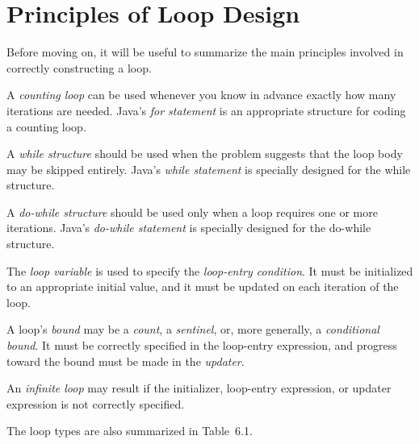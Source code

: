 \section{Principles of Loop Design}
\label{principlesof-loop-design}
\noindent Before moving on, it will be useful to summarize the main
principles involved in correctly
constructing a loop.

\begin{BL}
\item  A {\it counting loop} can
be used whenever you know in advance exactly how many iterations are
needed.  Java's {\it for statement} is an appropriate structure for
coding a counting loop.

\item  A {\it while structure} should
be used when the problem suggests that the loop body may be skipped
entirely. Java's {\it while statement} is specially designed for the
while structure.

\item  A {\it do-while structure} should
be used only when a loop requires one or more iterations. Java's
{\it do-while statement} is specially designed for the do-while structure.

\item  The {\it loop variable} is used to specify the
{\it loop-entry condition}. It must be initialized to an appropriate
initial value, and it must be updated on each iteration of the loop.

\item  A loop's {\it bound} may be a {\it count}, a
{\it sentinel}, or, more generally, a {\it conditional bound}.  It
must be correctly specified in the loop-entry expression, and progress
toward the bound must be made in the {\it updater}.

\item  An {\it infinite loop} may result if the
initializer, loop-entry expression, or updater expression is not
correctly specified.
\end{BL}


\noindent The loop types are also summarized in Table~6.1.

